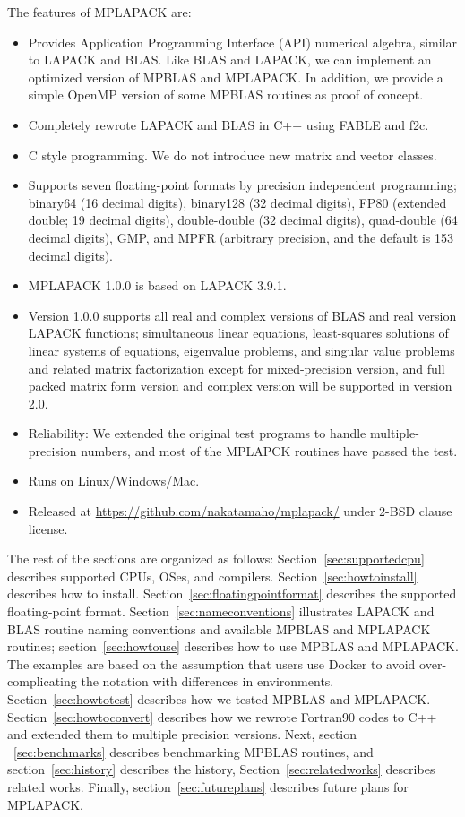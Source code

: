 \documentclass[12pt]{article}
\begin{document}
The features of MPLAPACK are:
\begin{itemize}
\item Provides Application Programming Interface (API) numerical algebra, similar to LAPACK and BLAS. Like BLAS and LAPACK, we can implement an optimized version of MPBLAS and MPLAPACK. In addition, we provide a simple OpenMP version of some MPBLAS routines as proof of concept.
\item Completely rewrote LAPACK and BLAS in C++ using FABLE and f2c.
\item C style programming. We do not introduce new matrix and vector classes. 
\item Supports seven floating-point formats by precision independent programming; binary64 (16 decimal digits), binary128 (32 decimal digits), FP80 (extended double; 19 decimal digits), double-double (32 decimal digits), quad-double (64 decimal digits), GMP, and MPFR (arbitrary precision, and the default is 153 decimal digits).
\item MPLAPACK 1.0.0 is based on LAPACK 3.9.1.
\item Version 1.0.0 supports all real and complex versions of BLAS and real version LAPACK functions; simultaneous linear equations, least-squares solutions of linear systems of equations, eigenvalue problems, and singular value problems and related matrix factorization except for mixed-precision version, and full packed matrix form version and complex version will be supported in version 2.0.
\item Reliability: We extended the original test programs to handle multiple-precision numbers, and most of the MPLAPCK routines have passed the test.
\item Runs on Linux/Windows/Mac.
\item Released at \url{https://github.com/nakatamaho/mplapack/} under 2-BSD clause license. 
\end{itemize}


The rest of the sections are organized as follows: Section~\ref{sec:supportedcpu} describes supported CPUs, OSes, and compilers. Section~\ref{sec:howtoinstall} describes how to install. Section~\ref{sec:floatingpointformat} describes the supported floating-point format. Section~\ref{sec:nameconventions} illustrates LAPACK and BLAS routine naming conventions and available MPBLAS and MPLAPACK routines; section~\ref{sec:howtouse} describes how to use MPBLAS and MPLAPACK. The examples are based on the assumption that users use Docker to avoid over-complicating the notation with differences in environments.
Section~\ref{sec:howtotest} describes how we tested MPBLAS and MPLAPACK.
Section~\ref{sec:howtoconvert} describes how we rewrote Fortran90 codes to C++ and extended them to multiple precision versions. Next, section ~\ref{sec:benchmarks} describes benchmarking MPBLAS routines, and section~\ref{sec:history} describes the history, Section~\ref{sec:relatedworks} describes related works. Finally, section~\ref{sec:futureplans} describes future plans for MPLAPACK. 
\end{document}
